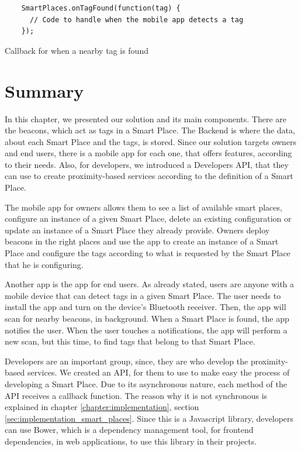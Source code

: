 \begin{listing}[H]
  \begin{verbatim}
    SmartPlaces.onTagFound(function(tag) {
      // Code to handle when the mobile app detects a tag
    });
  \end{verbatim}
  \caption[Tag found]{Callback for when a nearby tag is found}
  \label{code:smartplaces_tag_found}
\end{listing}

\section{Summary}
\label{sec:solution_summary}
In this chapter, we presented our solution and its main components.
There are the beacons, which act as tags in a Smart Place.
The Backend is where the data, about each Smart Place and the tags, is stored.
Since our solution targets owners and end users, there is a mobile app for each one, that offers features, according to their needs.
Also, for developers, we introduced a Developers \gls{API}, that they can use to create proximity-based services according to the definition of a Smart Place.

The mobile app for owners allows them to see a list of available smart places, configure an instance of a given Smart Place, delete an existing configuration or update an instance of a Smart Place they already provide.
Owners deploy beacons in the right places and use the app to create an instance of a Smart Place and configure the tags according to what is requested by the Smart Place that he is configuring.

Another app is the app for end users.
As already stated, users are anyone with a mobile device that can detect tags in a given Smart Place.
The user needs to install the app and turn on the device's Bluetooth receiver.
Then, the app will scan for nearby beacons, in background.
When a Smart Place is found, the app notifies the user.
When the user touches a notifications, the app will perform a new scan, but this time, to find tags that belong to that Smart Place.

Developers are an important group, since, they are who develop the proximity-based services.
We created an \gls{API}, for them to use to make easy the process of developing a Smart Place.
Due to its asynchronous nature, each method of the \gls{API} receives a callback function.
The reason why it is not synchronous is explained in chapter \ref{chapter:implementation}, section \ref{sec:implementation_smart_places}.
Since this is a Javascript library, developers can use Bower, which is a dependency management tool, for frontend dependencies, in web applications, to use this library in their projects.

